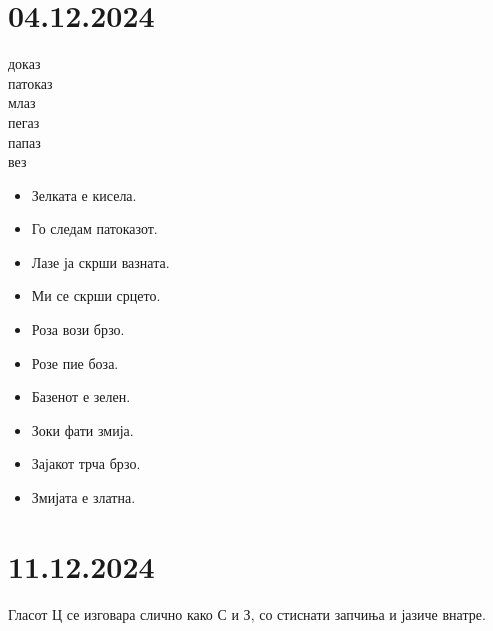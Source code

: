 \documentclass[a5paper,12pt]{article}
\newenvironment{activity}[1]{%
  \begin{tcolorbox}[colback=boxcolor,colframe=titlecolor,title={\textbf{#1}},fonttitle=\bfseries]
}{%
  \end{tcolorbox}
}
\newenvironment{instruction}{%
  \begin{tcolorbox}[colback=white,colframe=accentcolor,title={\textbf{Инструкции}},fonttitle=\bfseries] 
}{%
  \end{tcolorbox}
}
\begin{document}
\section{04.12.2024} 
\begin{activity}{Зборчиња}
\begin{multicols}{4}
доказ\\ патоказ\\ млаз\\ пегаз\\ папаз\\ вез
\end{multicols}
\end{activity}
\begin{itemize}
  \item Зелката е кисела.
  \item Го следам патоказот.
  \item Лазе ја скрши вазната.
  \item Ми се скрши срцето.
  \item Роза вози брзо.
  \item Розе пие боза. 
  \item Базенот е зелен.
  \item Зоки фати змија.
  \item Зајакот трча брзо.
  \item Змијата е златна.
\end{itemize}

\section{11.12.2024} 
\begin{instruction}
Гласот Ц се изговара слично како С и З, со стиснати запчиња и јазиче внатре.
\end{instruction}
\end{document}
